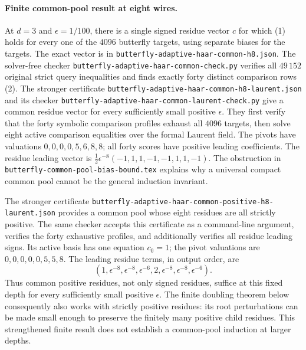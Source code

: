 \documentclass[11pt]{article}
\begin{document}
\paragraph{Finite common-pool result at eight wires.}
At $d=3$ and $\epsilon=1/100$, there is a single signed residue vector
$c$ for which (1) holds for every one of the $4096$ butterfly targets,
using separate biases for the targets. The exact vector is in
\texttt{butterfly-adaptive-haar-common-h8.json}.
The solver-free checker
\texttt{butterfly-adaptive-haar-common-check.py} verifies all
$49\,152$ original strict query inequalities and finds exactly forty
distinct comparison rows (2). The stronger certificate
\texttt{butterfly-adaptive-haar-common-h8-laurent.json} and its checker
\texttt{butterfly-adaptive-haar-common-laurent-check.py} give a common
residue vector for every sufficiently small positive $\epsilon$. They
first verify that the forty symbolic comparison profiles exhaust all
$4096$ targets, then solve eight active comparison equalities over the
formal Laurent field. The pivots have valuations
$0,0,0,0,5,6,8,8$; all forty scores have positive leading coefficients.
The residue leading vector is
$\tfrac12\epsilon^{-8}(-1,1,1,-1,-1,1,1,-1)$.
The obstruction in
\texttt{butterfly-common-pool-bias-bound.tex} explains why a universal
compact common pool cannot be the general induction invariant.

The stronger certificate
\texttt{butterfly-adaptive-haar-common-positive-h8-laurent.json}
provides a common pool whose eight residues are all strictly positive.
The same checker accepts this certificate as a command-line argument,
verifies the forty exhaustive profiles, and additionally verifies all
residue leading signs. Its active basis has one equation $c_0=1$;
the pivot valuations are $0,0,0,0,0,5,5,8$.
The leading residue terms, in output order, are
\[
 (1,\epsilon^{-8},\epsilon^{-8},\epsilon^{-6},
       2,\epsilon^{-8},\epsilon^{-8},\epsilon^{-6}).
\]
Thus common positive residues, not only signed residues, suffice at
this fixed depth for every sufficiently small positive $\epsilon$.
The finite doubling theorem below consequently also works with
strictly positive residues: its root perturbations can be made small
enough to preserve the finitely many positive child residues.
This strengthened finite result does not establish a common-pool
induction at larger depths.
\end{document}
